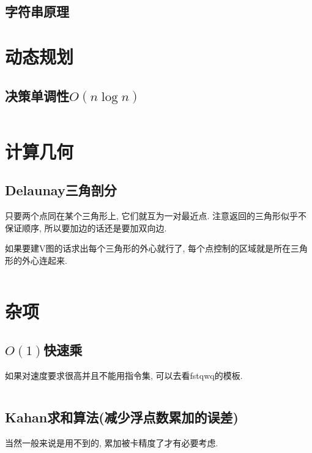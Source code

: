 \documentclass[a4paper, twoside]{article}
\begin{document}
\begin{multicols}{2}
			\subsection{字符串原理}
				

		\newpage
		\section{动态规划}
			\subsection{决策单调性$O(n\log n)$}
				\inputminted{cpp}{../src/DP/决策单调性.cpp}
			
		

		\newpage
		\section{计算几何}
		 	\subsection{Delaunay三角剖分}
				只要两个点同在某个三角形上, 它们就互为一对最近点. 注意返回的三角形似乎不保证顺序, 所以要加边的话还是要加双向边.
				
				如果要建V图的话求出每个三角形的外心就行了, 每个点控制的区域就是所在三角形的外心连起来.
				\inputminted{cpp}{../src/geometry/delaunay.cpp}

		\newpage
		\section{杂项}
			\subsection{$O(1)$快速乘}
				如果对速度要求很高并且不能用指令集, 可以去看fstqwq的模板.

				\inputminted{cpp}{../src/misc/O(1)快速乘.cpp}
			
			\subsection{Kahan求和算法(减少浮点数累加的误差)}
				当然一般来说是用不到的, 累加被卡精度了才有必要考虑.
				\inputminted{cpp}{../src/misc/kahan.cpp}
			

\end{multicols}
\end{document}
